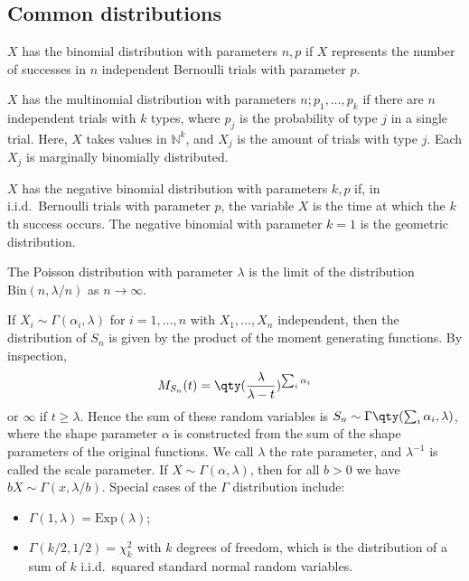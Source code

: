 \subsection{Common distributions}
$X$ has the binomial distribution with parameters $n, p$ if $X$ represents the number of successes in $n$ independent Bernoulli trials with parameter $p$.

$X$ has the multinomial distribution with parameters $n; p_1, \dots, p_k$ if there are $n$ independent trials with $k$ types, where $p_j$ is the probability of type $j$ in a single trial.
Here, $X$ takes values in $\mathbb N^k$, and $X_j$ is the amount of trials with type $j$.
Each $X_j$ is marginally binomially distributed.

$X$ has the negative binomial distribution with parameters $k, p$ if, in i.i.d.\ Bernoulli trials with parameter $p$, the variable $X$ is the time at which the $k$th success occurs.
The negative binomial with parameter $k = 1$ is the geometric distribution.

The Poisson distribution with parameter $\lambda$ is the limit of the distribution $\mathrm{Bin}(n, \lambda/n)$ as $n \to \infty$.

If $X_i \sim \Gamma(\alpha_i, \lambda)$ for $i = 1, \dots, n$ with $X_1, \dots, X_n$ independent, then the distribution of $S_n$ is given by the product of the moment generating functions.
By inspection,
\begin{align*}
	M_{S_n}(t) = \qty(\frac{\lambda}{\lambda - t})^{\sum_i \alpha_i}
\end{align*}
or $\infty$ if $t \geq \lambda$.
Hence the sum of these random variables is $S_n \sim \Gamma\qty(\sum_{i} \alpha_i, \lambda)$, where the shape parameter $\alpha$ is constructed from the sum of the shape parameters of the original functions.
We call $\lambda$ the rate parameter, and $\lambda^{-1}$ is called the scale parameter.
If $X \sim \Gamma(\alpha, \lambda)$, then for all $b > 0$ we have $bX \sim \Gamma(x, \lambda/b)$.
Special cases of the $\Gamma$ distribution include:
\begin{itemize}
	\item $\Gamma(1, \lambda) = \mathrm{Exp}(\lambda)$;
	\item $\Gamma(k/2, 1/2) = \chi_k^2$ with $k$ degrees of freedom, which is the distribution of a sum of $k$ i.i.d.\ squared standard normal random variables.
\end{itemize}
